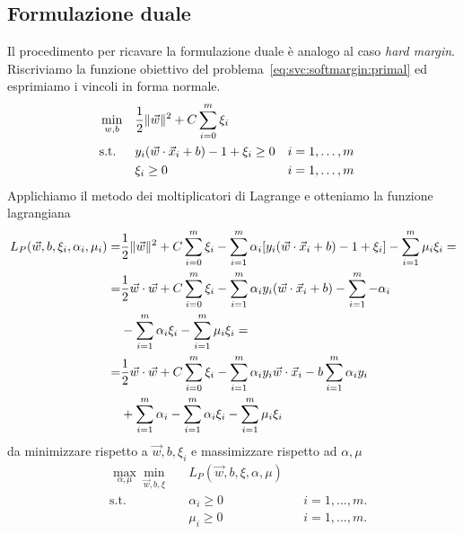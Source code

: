 \subsection{Formulazione duale}\label{subsec:soft_margin_dual}
Il procedimento per ricavare la formulazione duale è analogo al caso \emph{hard margin}.
Riscriviamo la funzione obiettivo del problema~\cref{eq:svc:softmargin:primal} ed esprimiamo i vincoli in forma normale.
\begin{equation}
\label{eq:svc:softmargin:primal_convenient}
\begin{aligned}
& \min_{w,b}    && \frac{1}{2}\|\Vec{w}\|^2 + C\sum_{i=0}^{m} \xi_i \\
& \textrm{s.t.} && y_i(\Vec{w}\cdot \Vec{x}_i + b) - 1 + \xi_i \geq 0 && i=1,\dots,m \\
&               && \xi_i \geq 0  && i=1,\dots,m 
\end{aligned}
\end{equation}
%
Applichiamo il metodo dei moltiplicatori di Lagrange e otteniamo la funzione lagrangiana
\begin{equation}
\label{eq:svc:softmargin:lagrange_fn}
\begin{split}
L_P(\Vec{w},b, \xi_i, \alpha_i, \mu_i) = & \frac{1}{2}\|\Vec{w}\|^2 + C\sum_{i=0}^{m} \xi_i - \sum_{i=1}^{m} \alpha_i [y_i(\Vec{w}\cdot \Vec{x}_i +b) -1 +\xi_i] - \sum_{i=1}^{m}\mu_i\xi_i =\\
        = & \frac{1}{2}\Vec{w}\cdot\Vec{w} + C\sum_{i=0}^{m} \xi_i - \sum_{i=1}^{m} \alpha_i y_i(\Vec{w}\cdot \Vec{x}_i +b) -  \sum_{i=1}^{m} - \alpha_i  \\ & - \sum_{i=1}^{m} \alpha_i\xi_i - \sum_{i=1}^{m}\mu_i\xi_i= \\
        = & \frac{1}{2}\Vec{w}\cdot\Vec{w} + C\sum_{i=0}^{m} \xi_i - \sum_{i=1}^{m} \alpha_i y_i \Vec{w}\cdot \Vec{x}_i - b \sum_{i=1}^{m} \alpha_i y_i \\ & + \sum_{i=1}^{m} \alpha_i - \sum_{i=1}^{m} \alpha_i\xi_i - \sum_{i=1}^{m}\mu_i\xi_i
\end{split}
\end{equation}
da minimizzare rispetto a $\Vec{w},b,\xi_i$ e massimizzare rispetto ad $\alpha, \mu$ 
\begin{equation}
\label{eq:svc:softmargin:max_min}
\begin{aligned}
& \max_{\alpha, \mu} \min_{\Vec{w}, b, \xi} && L_P(\Vec{w},b, \xi, \alpha, \mu) \\
& \textrm{s.t.} && \alpha_i \geq 0  && i=1,..., m.\\
&               && \mu_i \geq 0     && i=1,..., m.\\
\end{aligned}
\end{equation}
